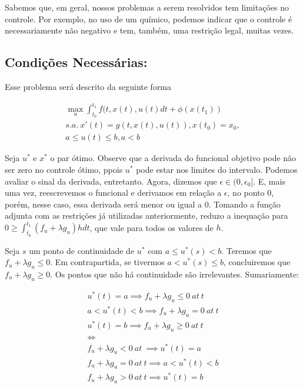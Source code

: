 Sabemos que, em geral, nossos problemas a serem resolvidos tem limitações no controle. Por exemplo, no uso de um químico, podemos indicar que o controle é necessariamente não negativo e tem, também, uma restrição legal, muitas vezes. 

\subsection{Condições Necessárias:} Esse problema será descrito da seguinte forma

\begin{align*}
    \max_u \int_{t_0}^{t_1} f(t,x(t),u(t)dt + \phi(x(t_1)) \\
    s.a.~x'(t) = g(t,x(t),u(t)), x(t_0) = x_0, \\
    a \leq u(t) \leq b, a < b
\end{align*}

Seja $u^*$ e $x^*$ o par ótimo. Observe que a derivada do funcional objetivo pode não ser zero no controle ótimo, ppois $u^*$ pode estar nos limites do intervalo. Podemos avaliar o sinal da derivada, entretanto. Agora, dizemos que $\epsilon \in (0,\epsilon _0]$.  E, mais uma vez, reescrevemos o funcional e derivamos em relação a $\epsilon$, no ponto $0$, porém, nesse caso, essa derivada será menor ou igual a $0$. Tomando a função adjunta com as restrições já utilizadas anteriormente, reduzo a inequação para $0 \geq \int_{t_0}^{t_1} (f_u + \lambda g_u)h dt$, que vale para todos os valores de $h$. 

Seja $s$ um ponto de continuidade de $u^*$ com $a \leq u^*(s) < b$. Teremos que $f_u + \lambda g_u \leq 0$. Em contrapartida, se tivermos $a < u^*(s) \leq b$, concluiremos que $f_u + \lambda g_u \geq 0$. Os pontos que não há continuidade são irrelevantes. Sumariamente:

\begin{align*}
    u^*(t) = a \implies  f_u + \lambda g_u \leq 0 ~at~ t \\
    a < u^*(t) < b \implies f_u + \lambda g_u = 0 ~at~ t \\
    u^*(t) = b \implies f_u + \lambda g_u \geq 0 ~at~ t \\ 
    \iff \\
    f_u + \lambda g_u < 0 ~at~ \implies u^*(t) = a \\
    f_u + \lambda g_u = 0 ~at~ t \implies a < u^*(t) < b \\
    f_u + \lambda g_u > 0 ~at~ t \implies u^*(t) = b \\
\end{align*}